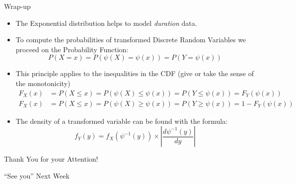 \documentclass[smaller]{beamer}\usepackage[]{graphicx}\usepackage[]{color}
\begin{document}
\begin{frame}{Wrap-up}
  \begin{itemize}
  \item The Exponential distribution helps to model \emph{duration} data.\bigskip
  \item To compute the probabilities of transformed Discrete Random Variables we proceed on the Probability Function:
  $$P(X = x) = P(\psi(X) = \psi(x)) = P(Y = \psi(x))$$
  \item This principle applies to the inequalities in the CDF (give or take the sense of the monotonicity)
  \begin{align*}
  F_X(x) &= P(X \leq x) = P(\psi(X) \leq \psi(x)) = P(Y \leq \psi(x)) = F_Y(\psi(x)) \\
  F_X(x) &= P(X \leq x) = P(\psi(X) \geq \psi(x)) = P(Y \geq \psi(x)) = 1-F_Y(\psi(x))
  \end{align*}
  \item The density of a transformed variable can be found with the formula:
  \begin{equation*}
  f_{Y}\left( y\right) =f_{X}\left( \psi ^{-1}\left( y\right) \right) \times
  \left\vert \frac{d\psi ^{-1}\left( y\right) }{dy}\right\vert
  \end{equation*}
  \end{itemize}
\end{frame}

\begin{frame}
  \begin{center}
  \Large{Thank You for your Attention!}

  \bigskip
  \pause

  \Large{``See you'' Next Week}
  \end{center}
\end{frame}
\end{document}
